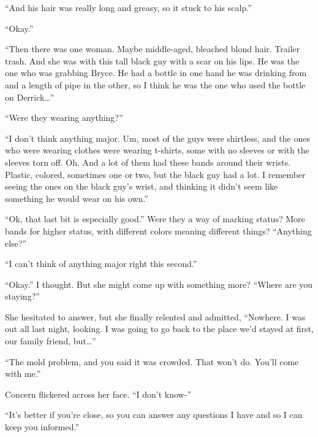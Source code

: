 ``And his hair was really long and greasy, so it stuck to his scalp.''



``Okay.''



``Then there was one woman.  Maybe middle-aged, bleached blond hair.  Trailer trash.  And she was with this tall black guy with a scar on his lips.  He was the one who was grabbing Bryce.  He had a bottle in one hand he was drinking from and a length of pipe in the other, so I think he was the one who used the bottle on Derrick\ldots''



``Were they wearing anything?''



``I don't think anything major.  Um, most of the guys were shirtless, and the ones who were wearing clothes were wearing t-shirts, some with no sleeves or with the sleeves torn off.  Oh.  And a lot of them had these bands around their wrists.  Plastic, colored, sometimes one or two, but the black guy had a lot.  I remember seeing the ones on the black guy's wrist, and thinking it didn't seem like something he would wear on his own.''



``Ok, that last bit is especially good.''  Were they a way of marking status?  More bands for higher status, with different colors meaning different things?  ``Anything else?''



``I can't think of anything major right this second.''



``Okay.''  I thought.  But she might come up with something more?  ``Where are you staying?''



She hesitated to answer, but she finally relented and admitted, ``Nowhere.  I was out all last night, looking.  I was going to go back to the place we'd stayed at first, our family friend, but\ldots''



``The mold problem, and you said it was crowded.  That won't do.  You'll come with me.''



Concern flickered across her face.  ``I don't know-''



``It's better if you're close, so you can answer any questions I have and so I can keep you informed.''



